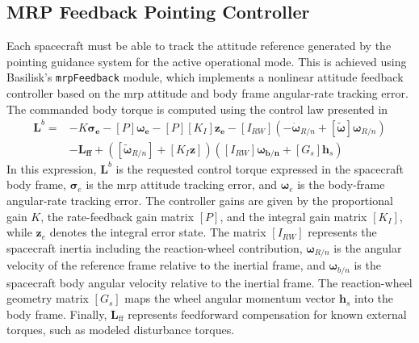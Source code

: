 \subsection{MRP Feedback Pointing Controller}
\label{sec:attitude_controller}
Each spacecraft must be able to track the attitude reference generated by the pointing guidance system for the active operational mode. This is achieved using Basilisk's \texttt{mrpFeedback} module, which implements a nonlinear attitude feedback controller based on the \gls{mrp} attitude and body frame angular-rate tracking error. The commanded body torque is computed using the control law presented in \cite{mrpFeedback}
\begin{equation}
\begin{split}
    \mathbf{L}^b = &-K\boldsymbol{\sigma_{e}} - [P]\boldsymbol{\omega_e} - [P][K_I]\mathbf{z_e} - [I_{RW}]\left(-\dot{\boldsymbol{\omega}}_{R/n} + [\tilde{\boldsymbol{\omega}}]\boldsymbol{\omega}_{R/n}\right)\\ 
    &- \mathbf{L_{ff}} + \left([\tilde{\boldsymbol{\omega}}_{R/n}] + [K_I\mathbf{z}]\right)\left([I_{RW}]\boldsymbol{\omega_{b/n}} + [G_s]\mathbf{h}_s\right)
\end{split}
\label{eq:full_pointing_control_law}
\end{equation}
In this expression, $\mathbf{L}^{b}$ is the requested control torque expressed in the spacecraft body frame, $\boldsymbol{\sigma}_{e}$ is the \gls{mrp} attitude tracking error, and $\boldsymbol{\omega}_{e}$ is the body-frame angular-rate tracking error. The controller gains are given by the proportional gain $K$, the rate-feedback gain matrix $[P]$, and the integral gain matrix $[K_I]$, while $\mathbf{z}_{e}$ denotes the integral error state. The matrix $[I_{RW}]$ represents the spacecraft inertia including the reaction-wheel contribution, $\boldsymbol{\omega}_{R/n}$ is the angular velocity of the reference frame relative to the inertial frame, and $\boldsymbol{\omega}_{b/n}$ is the spacecraft body angular velocity relative to the inertial frame. The reaction-wheel geometry matrix $[G_s]$ maps the wheel angular momentum vector $\mathbf{h}_s$ into the body frame. Finally, $\mathbf{L}_{\mathrm{ff}}$ represents feedforward compensation for known external torques, such as modeled disturbance torques.

